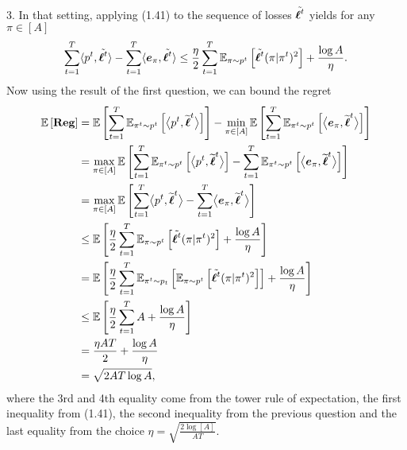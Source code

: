 \begin{solution}[]
3. In that setting, applying (1.41) to the sequence of losses $ \ltt $ yields for any $ \pi \in [A] $ 
\begin{equation*}
	\sum_{t=1}^{T} \siprod{p^t}{\ltt} - \sum_{t=1}^{T} \siprod{\boldsymbol{e}_{\pi}}{\ltt} \leq
	\frac{\eta}{2} \sum_{t=1}^{T}\EEs{\ltt(\pi| \pi^t)^2}{\pi\sim p^t} + \frac{\log A}{\eta}.
\end{equation*}
Now using the result of the first question, we can bound the regret 
\begin{align*}
	\EE{\Reg} &= \EE{\sum_{t=1}^T \EEs{\biprod{p^t}{\wt \bsl^t}}{\pi^t \sim p^t}}  -\min_{\pi \in
[A]}\EE{\sum_{t=1}^T\EEs{\biprod{\boldsymbol{e}_\pi}{\wt \bsl^t}}{\pi^t \sim p^t}}\\
		  &= \max_{\pi\in [A]} \EE{\sum_{t=1}^T \EEs{\biprod{p^t}{\wt \bsl^t}}{\pi^t \sim p^t}  -\sum_{t=1}^T\EEs{\biprod{\boldsymbol{e}_\pi}{\wt \bsl^t}}{\pi^t \sim p^t}}\\
		  &= \max_{\pi\in [A]} \EE{\sum_{t=1}^T \biprod{p^t}{\wt \bsl^t}  -\sum_{t=1}^T \biprod{\boldsymbol{e}_\pi}{\wt \bsl^t}}\\
		  &\leq \EE{\frac{\eta}{2}\sum_{t=1}^{T}\EEs{\ltt(\pi|\pi^t)^2}{\pi\sim p^t} + \frac{\log A}{\eta}}\\
		  &=\EE{\frac{\eta}{2}\sum_{t=1}^{T}\EEs{\EEs{\ltt(\pi|\pi^t)^2}{\pi\sim p^t}}{\pi^t\sim p_t} +
		  \frac{\log A}{\eta}}\\
		  &\leq \EE{\frac{\eta}{2}\sum_{t=1}^{T} A + \frac{\log A}{\eta}}\\
		  &= \frac{\eta A T}{2} + \frac{\log A}{\eta}\\
		  &= \sqrt{2AT \log A},
\end{align*}
where the 3rd and 4th equality come from the tower rule of expectation, the first inequality from (1.41), the second
inequality from the previous question and the last equality from the choice $ \eta = \sqrt{\frac{2\log[A]}{AT}} $.
\end{solution}
